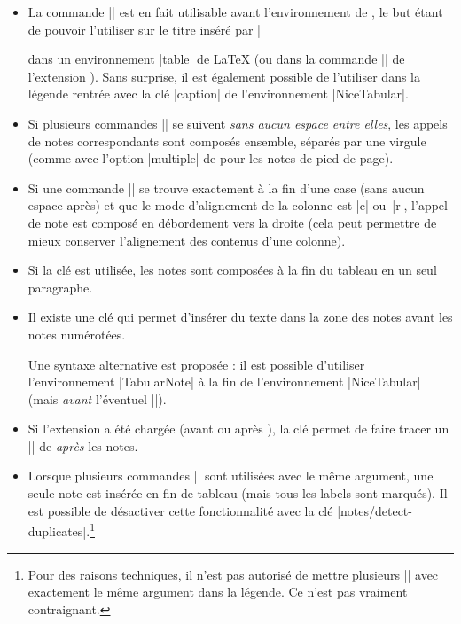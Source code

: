 \documentclass[dvipsnames]{article}%
\begin{document}
\medskip
\begin{itemize}
\item La commande |\tabularnote| est en fait utilisable avant
l'environnement de , le but étant de pouvoir l'utiliser sur le
titre inséré par |\caption| dans un environnement |{table}| de LaTeX (ou dans la
commande |\captionof| de l'extension ). Sans surprise, il est
également possible de l'utiliser dans la légende rentrée avec la clé |caption|
de l'environnement |{NiceTabular}|.

\item Si plusieurs commandes || se suivent \emph{sans aucun espace
  entre elles}, les appels de notes correspondants sont composés ensemble,
séparés par une virgule (comme avec l'option |multiple| de  pour
les notes de pied de page).

\item Si une commande || se trouve exactement à la fin d'une
case (sans aucun espace après) et que le mode d'alignement de la colonne est |c|
ou~|r|, l'appel de note est composé en débordement vers la droite (cela peut
permettre de mieux conserver l'alignement des contenus d'une colonne).

\item Si la clé  est utilisée, les notes sont composées à
la fin du tableau en un seul paragraphe.

\item {}
Il existe une clé  qui permet d'insérer du texte dans la
zone des notes avant les notes numérotées.


Une syntaxe alternative est proposée : il est possible d'utiliser
l'environnement |{TabularNote}| à la fin de l'environnement |{NiceTabular}|
(mais \emph{avant} l'éventuel |\CodeAfter|).

\item Si l'extension  a été chargée (avant ou après
), la clé  permet de faire tracer
un |\bottomrule| de  \emph{après} les notes.

\item Lorsque plusieurs commandes |\tabularnote| sont utilisées avec le même
argument, une seule note est insérée en fin de tableau (mais tous les labels
sont marqués). Il est possible de désactiver cette fonctionnalité avec la clé
|notes/detect-duplicates|.\footnote{Pour des raisons techniques, il n'est pas
  autorisé de mettre plusieurs |\tabularnote| avec exactement le même argument
  dans la légende. Ce n'est pas vraiment contraignant.}


\end{itemize}
\end{document}
